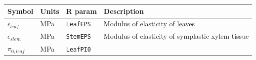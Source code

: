 \documentclass[]{book}
\begin{document}
\begin{longtable}[]{@{}llll@{}}
\toprule
\begin{minipage}[b]{0.11\columnwidth}\raggedright
Symbol\strut
\end{minipage} & \begin{minipage}[b]{0.10\columnwidth}\raggedright
Units\strut
\end{minipage} & \begin{minipage}[b]{0.12\columnwidth}\raggedright
R param\strut
\end{minipage} & \begin{minipage}[b]{0.45\columnwidth}\raggedright
Description\strut
\end{minipage}\tabularnewline
\midrule
\endhead
\begin{minipage}[t]{0.11\columnwidth}\raggedright
\(\epsilon_{leaf}\)\strut
\end{minipage} & \begin{minipage}[t]{0.10\columnwidth}\raggedright
MPa\strut
\end{minipage} & \begin{minipage}[t]{0.12\columnwidth}\raggedright
\texttt{LeafEPS}\strut
\end{minipage} & \begin{minipage}[t]{0.45\columnwidth}\raggedright
Modulus of elasticity of leaves\strut
\end{minipage}\tabularnewline
\begin{minipage}[t]{0.11\columnwidth}\raggedright
\(\epsilon_{stem}\)\strut
\end{minipage} & \begin{minipage}[t]{0.10\columnwidth}\raggedright
MPa\strut
\end{minipage} & \begin{minipage}[t]{0.12\columnwidth}\raggedright
\texttt{StemEPS}\strut
\end{minipage} & \begin{minipage}[t]{0.45\columnwidth}\raggedright
Modulus of elasticity of symplastic xylem tissue\strut
\end{minipage}\tabularnewline
\begin{minipage}[t]{0.11\columnwidth}\raggedright
\(\pi_{0,leaf}\)\strut
\end{minipage} & \begin{minipage}[t]{0.10\columnwidth}\raggedright
MPa\strut
\end{minipage} & \begin{minipage}[t]{0.12\columnwidth}\raggedright
\texttt{LeafPI0}\strut

\end{minipage}
\end{longtable}
\end{document}
